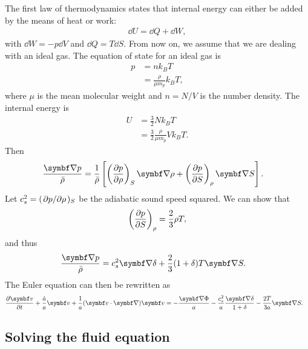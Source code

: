 The first law of thermodynamics states that internal energy can either be added by the means of heat or work:
\begin{align*}
	\dd{U} = \dd{Q} + \dd{W},
\end{align*}
with $\dd{W} = - p \dd{V}$ and $\dd{Q} = T \dd{S}$. From now on, we assume that we are dealing with an ideal gas. The equation of state for an ideal gas is
\begin{align*}
	p
	&= n k_B T\\
	&= \frac{\rho}{\mu m_p} k_B T,
\end{align*}
where $\mu$ is the mean molecular weight and $n = N/V$ is the number density. The internal energy is
\begin{align*}
	U
	&= \frac{3}{2} N k_B T\\
	&= \frac{3}{2} \frac{\rho}{\mu m_p} V k_B T.
\end{align*}
Then
\begin{align*}
	\frac{\Grad p}{\bar{\rho}}
	&= \frac{1}{\bar{\rho}}
	\left[ 
		\left( \pdv{p}{\rho} \right)_S \Grad \rho
		+ 
		\left( \pdv{p}{S} \right)_\rho \Grad S
	\right].
\end{align*}
Let $c_s^2 = (\pdv*{p}{\rho})_S$ be the adiabatic sound speed squared. We can show that
\begin{align*}
	\left( \pdv{p}{S} \right)_\rho = \frac{2}{3} \rho T,
\end{align*}
and thus
\begin{align*}
	\frac{\Grad p}{\bar{\rho}}
	&= c_s^2 \Grad \delta + \frac{2}{3} (1+\delta) T \Grad S.
\end{align*}
The Euler equation can then be rewritten as
\begin{align*}
	\pdv{\vec{v}}{t} + \frac{\dot{a}}{a} \vec{v} + \frac{1}{a} (\vec{v} \cdot \Grad) \vec{v}
	&= - \frac{\Grad \Phi}{a} - \frac{c_s^2}{a} \frac{\Grad \delta}{1 + \delta} - \frac{2T}{3a} \Grad S.
\end{align*}

\subsection{Solving the fluid equation}

